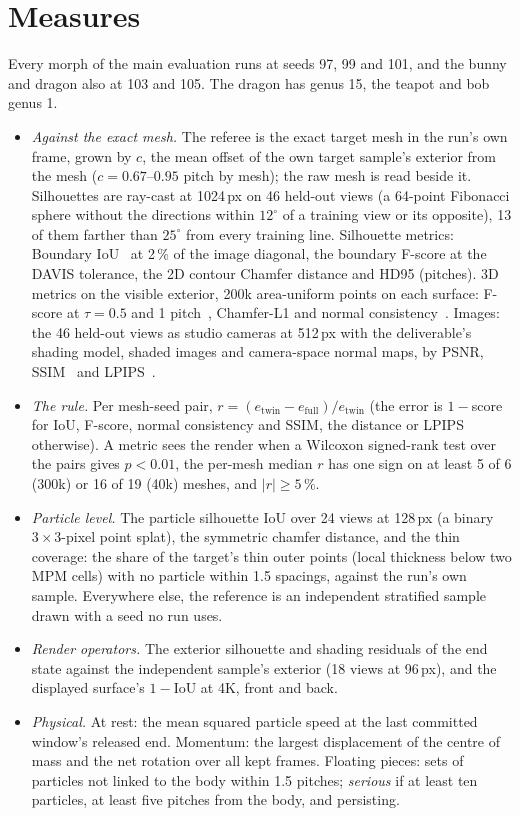 \section{Measures}
\label{app:ch4_measures}
Every morph of the main evaluation runs at seeds 97, 99 and 101, and the bunny and dragon also at 103 and 105. The dragon
has genus 15, the teapot and bob genus 1.
\begin{itemize}
  \item \emph{Against the exact mesh.} The referee is the exact target mesh in the run's own frame, grown by $c$, the mean
        offset of the own target sample's exterior from the mesh ($c=0.67$--$0.95$ pitch by mesh); the raw mesh is read
        beside it. Silhouettes are ray-cast at 1024\,px on 46 held-out views (a 64-point Fibonacci sphere without the
        directions within $12^\circ$ of a training view or its opposite), 13 of them farther than $25^\circ$ from every training
        line. Silhouette metrics: Boundary IoU~\citep{cheng2021boundaryiou} at 2\,\% of the image diagonal, the boundary
        F-score at the DAVIS tolerance, the 2D contour Chamfer distance and HD95 (pitches). 3D metrics on the visible exterior,
        200k area-uniform points on each surface: F-score at $\tau=0.5$ and 1 pitch~\citep{knapitsch2017tanks,tatarchenko2019singleview},
        Chamfer-L1 and normal consistency~\citep{mescheder2019occupancy}. Images: the 46 held-out views as studio cameras at
        512\,px with the deliverable's shading model, shaded images and camera-space normal maps, by PSNR,
        SSIM~\citep{wang2004ssim} and LPIPS~\citep{zhang2018lpips}.
  \item \emph{The rule.} Per mesh-seed pair, $r=(e_{\mathrm{twin}}-e_{\mathrm{full}})/e_{\mathrm{twin}}$ (the error is $1-$score
        for IoU, F-score, normal consistency and SSIM, the distance or LPIPS otherwise). A metric sees the render when a
        Wilcoxon signed-rank test over the pairs gives $p<0.01$, the per-mesh median $r$ has one sign on at least 5 of 6
        (300k) or 16 of 19 (40k) meshes, and $\lvert r\rvert\geq5\,\%$.
  \item \emph{Particle level.} The particle silhouette IoU over 24 views at 128\,px (a binary $3\times3$-pixel point splat), the
        symmetric chamfer distance, and the thin coverage: the share of the target's thin outer points (local thickness below
        two MPM cells) with no particle within 1.5 spacings, against the run's own sample. Everywhere else, the reference is
        an independent stratified sample drawn with a seed no run uses.
  \item \emph{Render operators.} The exterior silhouette and shading residuals of the end state against the independent
        sample's exterior (18 views at 96\,px), and the displayed surface's $1-\mathrm{IoU}$ at 4K, front and back.
  \item \emph{Physical.} At rest: the mean squared particle speed at the last committed window's released end. Momentum: the
        largest displacement of the centre of mass and the net rotation over all kept frames. Floating pieces: sets of
        particles not linked to the body within 1.5 pitches; \emph{serious} if at least ten particles, at least five pitches
        from the body, and persisting.
\end{itemize}

